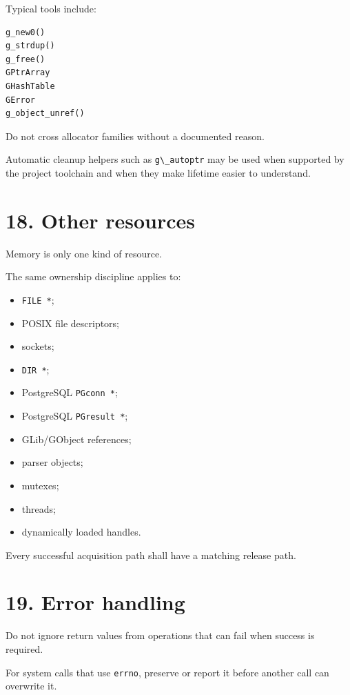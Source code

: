 \documentclass[11pt,a4paper]{article}
\begin{document}
Typical tools include:

\begin{lstlisting}
g_new0()
g_strdup()
g_free()
GPtrArray
GHashTable
GError
g_object_unref()
\end{lstlisting}

Do not cross allocator families without a documented reason.

Automatic cleanup helpers such as \passthrough{\lstinline!g\_autoptr!}
may be used when supported by the project toolchain and when they make
lifetime easier to understand.

\section{18. Other resources}\label{18-other-resources}

Memory is only one kind of resource.

The same ownership discipline applies to:

\begin{itemize}
\tightlist
\item
  \passthrough{\lstinline!FILE *!};
\item
  POSIX file descriptors;
\item
  sockets;
\item
  \passthrough{\lstinline!DIR *!};
\item
  PostgreSQL \passthrough{\lstinline!PGconn *!};
\item
  PostgreSQL \passthrough{\lstinline!PGresult *!};
\item
  GLib/GObject references;
\item
  parser objects;
\item
  mutexes;
\item
  threads;
\item
  dynamically loaded handles.
\end{itemize}

Every successful acquisition path shall have a matching release path.

\section{19. Error handling}\label{19-error-handling}

Do not ignore return values from operations that can fail when success
is required.

For system calls that use \passthrough{\lstinline!errno!}, preserve or
report it before another call can overwrite it.
\end{document}
